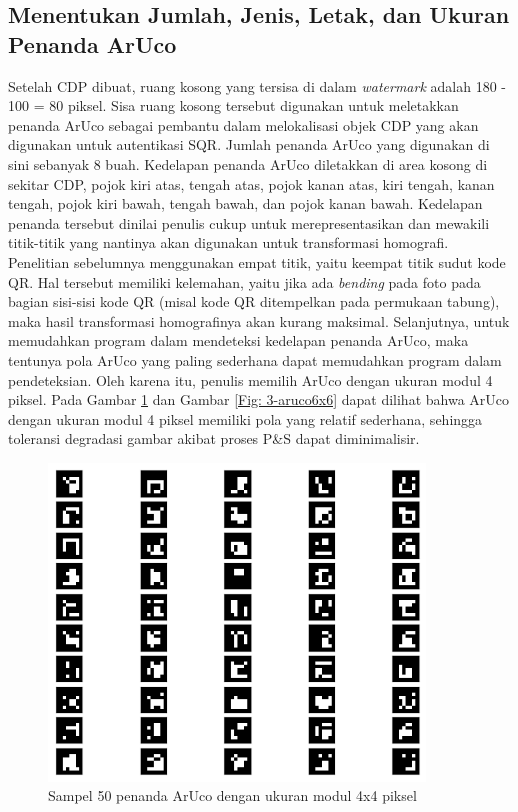 \subsection{Menentukan Jumlah, Jenis, Letak, dan Ukuran Penanda ArUco}
Setelah CDP dibuat, ruang kosong yang tersisa di dalam \emph{watermark} adalah 180 - 100 = 80 piksel. Sisa ruang kosong tersebut digunakan untuk meletakkan
penanda ArUco sebagai pembantu dalam melokalisasi objek CDP yang akan digunakan untuk autentikasi SQR. Jumlah penanda ArUco yang digunakan di sini sebanyak 8
buah. Kedelapan penanda ArUco diletakkan di area kosong di sekitar CDP, pojok kiri atas, tengah atas, pojok kanan atas, kiri tengah, kanan tengah, pojok kiri
bawah, tengah bawah, dan pojok kanan bawah. Kedelapan penanda tersebut dinilai penulis cukup untuk merepresentasikan dan mewakili titik-titik yang nantinya
akan digunakan untuk transformasi homografi. Penelitian sebelumnya menggunakan empat titik, yaitu keempat titik sudut kode QR. Hal tersebut memiliki kelemahan,
yaitu jika ada \emph{bending} pada foto pada bagian sisi-sisi kode QR (misal kode QR ditempelkan pada permukaan tabung), maka hasil transformasi homografinya
akan kurang maksimal. Selanjutnya, untuk memudahkan program dalam mendeteksi kedelapan penanda ArUco, maka tentunya pola ArUco yang paling sederhana dapat
memudahkan program dalam pendeteksian. Oleh karena itu, penulis memilih ArUco dengan ukuran modul 4 piksel. Pada Gambar \ref{Fig: 3-aruco4x4} dan Gambar
\ref{Fig: 3-aruco6x6} dapat dilihat bahwa ArUco dengan ukuran modul 4 piksel memiliki pola yang relatif sederhana, sehingga toleransi degradasi gambar akibat
proses P\&S dapat diminimalisir.

\begin{figure}[h]
	\centering
	\includegraphics[width=10cm]{contents/chapter-3/3-aruco4x4.png}
	\caption{Sampel 50 penanda ArUco dengan ukuran modul 4x4 piksel}
	\label{Fig: 3-aruco4x4}
\end{figure}

